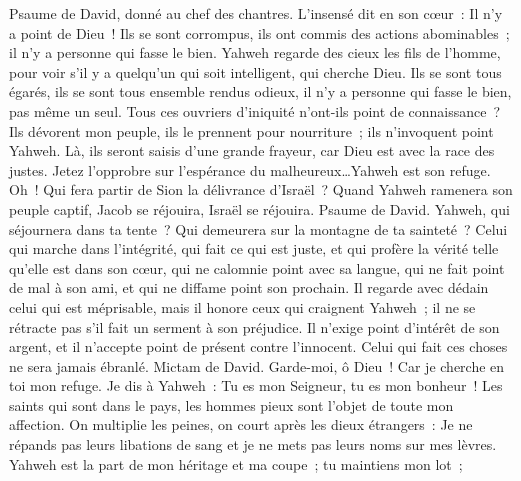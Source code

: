 \begin{multicols}{2}
\VerseOne{}Psaume de David, donné au chef des chantres. L'insensé dit en son cœur~: Il n'y a point de Dieu~! Ils se sont corrompus, ils ont commis des actions abominables~; il n'y a personne qui fasse le bien.
Yahweh regarde des cieux les fils de l'homme, pour voir s'il y a quelqu'un qui soit intelligent, qui cherche Dieu.
Ils se sont tous égarés, ils se sont tous ensemble rendus odieux, il n'y a personne qui fasse le bien, pas même un seul.
Tous ces ouvriers d'iniquité n'ont-ils point de connaissance~? Ils dévorent mon peuple, ils le prennent pour nourriture~; ils n'invoquent point Yahweh.
Là, ils seront saisis d'une grande frayeur, car Dieu est avec la race des justes.
Jetez l'opprobre sur l'espérance du malheureux…Yahweh est son refuge.
Oh~! Qui fera partir de Sion la délivrance d'Israël~? Quand Yahweh ramenera son peuple captif, Jacob se réjouira, Israël se réjouira.
\VerseOne{}Psaume de David. Yahweh, qui séjournera dans ta tente~? Qui demeurera sur la montagne de ta sainteté~?
Celui qui marche dans l'intégrité, qui fait ce qui est juste, et qui profère la vérité telle qu'elle est dans son cœur,
qui ne calomnie point avec sa langue, qui ne fait point de mal à son ami, et qui ne diffame point son prochain.
Il regarde avec dédain celui qui est méprisable, mais il honore ceux qui craignent Yahweh~; il ne se rétracte pas s'il fait un serment à son préjudice.
Il n'exige point d'intérêt de son argent, et il n'accepte point de présent contre l'innocent. Celui qui fait ces choses ne sera jamais ébranlé.
\VerseOne{}Mictam de David. Garde-moi, ô Dieu~! Car je cherche en toi mon refuge.
Je dis à Yahweh~: Tu es mon Seigneur, tu es mon bonheur~!
Les saints qui sont dans le pays, les hommes pieux sont l'objet de toute mon affection.
On multiplie les peines, on court après les dieux étrangers~: Je ne répands pas leurs libations de sang et je ne mets pas leurs noms sur mes lèvres.
Yahweh est la part de mon héritage et ma coupe~; tu maintiens mon lot~;

\end{multicols}
